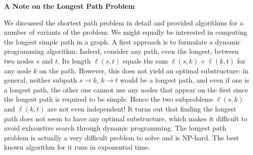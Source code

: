 \documentclass [12pt]{article}
\theoremstyle{definition}
\begin{document}
\textbf{A Note on the Longest Path Problem}

We discussed the shortest path problem in detail and provided algorithms for a number of variants of the problem. We might equally be interested in computing the longest simple path in a graph. A first approach is to formulate a dynamic programming algorithm. Indeed, consider any path, even the longest, between two nodes $s$ and $t$. Its length $\ell(s, t)$ equals the sum $\ell(s, k) + \ell(k, t)$ for any node $k$ on the path. However, this does not yield an optimal substructure: in general, neither subpath $s \to k$, $k \to t$ would be a longest path, and even if one is a longest path, the other one cannot use any nodes that appear on the first since the longest path is required to be simple. Hence the two subproblems $\ell(s, k)$ and $\ell(k, t)$ are not even independent! It turns out that finding the longest path does not seem to have any optimal substructure, which makes it difficult to avoid exhaustive search through dynamic programming. The longest path problem is actually a very difficult problem to solve and is NP-hard. The best known algorithm for it runs in exponential time.
\end{document}
